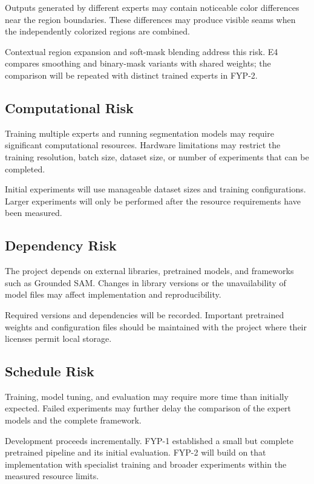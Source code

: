 \documentclass{FastFyp}
\begin{document}
Outputs generated by different experts may contain noticeable color differences near the region boundaries. These differences may produce visible seams when the independently colorized regions are combined.

Contextual region expansion and soft-mask blending address this risk. E4 compares smoothing and binary-mask variants with shared weights; the comparison will be repeated with distinct trained experts in FYP-2.

\subsection{Computational Risk}

Training multiple experts and running segmentation models may require significant computational resources. Hardware limitations may restrict the training resolution, batch size, dataset size, or number of experiments that can be completed.

Initial experiments will use manageable dataset sizes and training configurations. Larger experiments will only be performed after the resource requirements have been measured.

\subsection{Dependency Risk}

The project depends on external libraries, pretrained models, and frameworks such as Grounded SAM. Changes in library versions or the unavailability of model files may affect implementation and reproducibility.

Required versions and dependencies will be recorded. Important pretrained weights and configuration files should be maintained with the project where their licenses permit local storage.

\subsection{Schedule Risk}

Training, model tuning, and evaluation may require more time than initially expected. Failed experiments may further delay the comparison of the expert models and the complete framework.

Development proceeds incrementally. FYP-1 established a small but complete pretrained pipeline and its initial evaluation. FYP-2 will build on that implementation with specialist training and broader experiments within the measured resource limits.
\end{document}
